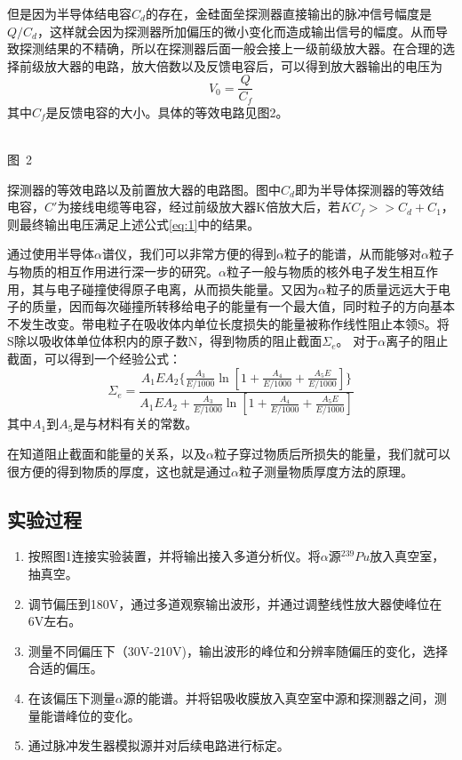 \documentclass[a4paper,10.0pt,twoside]{npr}
\begin{document}
\begin{multicols}{2}
但是因为半导体结电容$C_d$的存在，金硅面垒探测器直接输出的脉冲信号幅度是$Q/C_d$，这样就会因为探测器所加偏压的微小变化而造成输出信号的幅度。从而导致探测结果的不精确，所以在探测器后面一般会接上一级前级放大器。在合理的选择前级放大器的电路，放大倍数以及反馈电容后，可以得到放大器输出的电压为
\begin{equation}\label{eq:1}
	V_0 =\frac{Q}{C_f}
\end{equation}
其中$C_f$是反馈电容的大小。具体的等效电路见图2。

\begin{center}
   \def\svgwidth{0.4\textwidth}
   
\\
\xiaowu\song 图~2\begin{minipage}[t]{75mm} \quad 探测器的等效电路以及前置放大器的电路图。图中$C_d$即为半导体探测器的等效结电容，$C'$为接线电缆等电容，经过前级放大器K倍放大后，若$KC_f>>C_d+C_1$，则最终输出电压满足上述公式\ref{eq:1}中的结果。\\[-1mm]\wuhao
\end{minipage}
\end{center}

通过使用半导体$\alpha$谱仪，我们可以非常方便的得到$\alpha$粒子的能谱，从而能够对$\alpha$粒子与物质的相互作用进行深一步的研究。$\alpha$粒子一般与物质的核外电子发生相互作用，其与电子碰撞使得原子电离，从而损失能量。又因为$\alpha$粒子的质量远远大于电子的质量，因而每次碰撞所转移给电子的能量有一个最大值，同时粒子的方向基本不发生改变。带电粒子在吸收体内单位长度损失的能量被称作线性阻止本领S。将S除以吸收体单位体积内的原子数N，得到物质的阻止截面$\Sigma_e$。 对于$\alpha$离子的阻止截面，可以得到一个经验公式：
\begin{equation}\label{eq:e}
	\Sigma_e=\frac{A_1 EA_2 \{ \frac{A_3}{E/1000}\ln[1+\frac{A_4}{E/1000}+\frac{A_5 E}{E/1000}]\}}{A_1 EA_2+\frac{A_3}{E/1000}\ln[1+\frac{A_4}{E/1000}+\frac{A_5 E}{E/1000}]}
\end{equation}
其中$A_1$到$A_5$是与材料有关的常数。

在知道阻止截面和能量的关系，以及$\alpha$粒子穿过物质后所损失的能量，我们就可以很方便的得到物质的厚度，这也就是通过$\alpha$粒子测量物质厚度方法的原理。
\subsection{实验过程}

\begin{enumerate}
\item 按照图1连接实验装置，并将输出接入多道分析仪。将$\alpha$源$^{239}Pu$放入真空室，抽真空。
\item 调节偏压到180V，通过多道观察输出波形，并通过调整线性放大器使峰位在6V左右。
\item 测量不同偏压下（30V-210V)，输出波形的峰位和分辨率随偏压的变化，选择合适的偏压。
\item 在该偏压下测量$\alpha$源的能谱。并将铝吸收膜放入真空室中源和探测器之间，测量能谱峰位的变化。
\item 通过脉冲发生器模拟源并对后续电路进行标定。
\end{enumerate}



\end{multicols}
\end{document}
